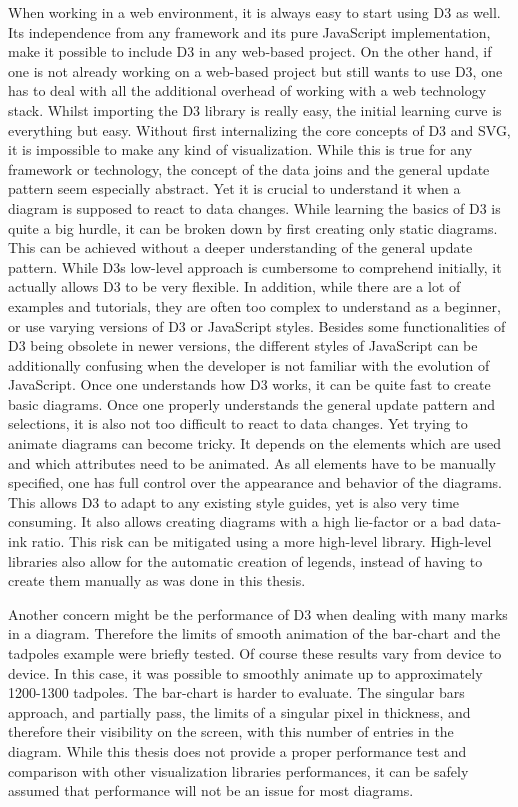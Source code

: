 When working in a web environment, it is always easy to start using D3 as well. Its independence from any framework and its pure JavaScript implementation, make it possible to include D3 in any web-based project. On the other hand, if one is not already working on a web-based project but still wants to use D3, one has to deal with all the additional overhead of working with a web technology stack. Whilst importing the D3 library is really easy, the initial learning curve is everything but easy. Without first internalizing the core concepts of D3 and SVG, it is impossible to make any kind of visualization. While this is true for any framework or technology, the concept of the data joins and the general update pattern seem especially abstract. Yet it is crucial to understand it when a diagram is supposed to react to data changes.
While learning the basics of D3 is quite a big hurdle, it can be broken down by first creating only static diagrams. This can be achieved without a deeper understanding of the general update pattern. While D3s low-level approach is cumbersome to comprehend initially, it actually allows D3 to be very flexible.
In addition, while there are a lot of examples and tutorials, they are often too complex to understand as a beginner, or use varying versions of D3 or JavaScript styles. Besides some functionalities of D3 being obsolete in newer versions, the different styles of JavaScript can be additionally confusing when the developer is not familiar with the evolution of JavaScript.
Once one understands how D3 works, it can be quite fast to create basic diagrams. Once one properly understands the general update pattern and selections, it is also not too difficult to react to data changes. Yet trying to animate diagrams can become tricky. It depends on the elements which are used and which attributes need to be animated. As all elements have to be manually specified, one has full control over the appearance and behavior of the diagrams. This allows D3 to adapt to any existing style guides, yet is also very time consuming. It also allows creating diagrams with a high lie-factor or a bad data-ink ratio. This risk can be mitigated using a more high-level library. High-level libraries also allow for the automatic creation of legends, instead of having to create them manually as was done in this thesis.

Another concern might be the performance of D3 when dealing with many marks in a diagram. Therefore the limits of smooth animation of the bar-chart and the tadpoles example\cite{bostock_2020} were briefly tested. Of course these results vary from device to device. In this case, it was possible to smoothly animate up to approximately 1200-1300 tadpoles. The bar-chart is harder to evaluate. The singular bars approach, and partially pass, the limits of a singular pixel in thickness, and therefore their visibility on the screen, with this number of entries in the diagram. While this thesis does not provide a proper performance test and comparison with other visualization libraries performances, it can be safely assumed that performance will not be an issue for most diagrams.

